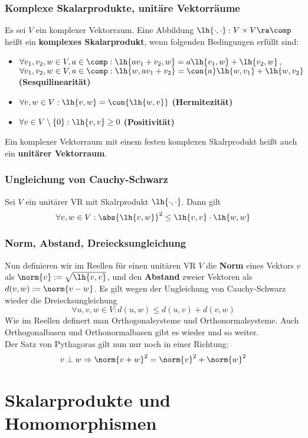 \documentclass{kit}
\begin{document}
    \subsubsection{Komplexe Skalarprodukte, unitäre Vektorräume}
      Es sei $V$ ein komplexer Vektorraum. Eine Abbildung $\lh{\cdot,\cdot}:V\times V\ra\comp$ heißt ein 
      \textbf{komplexes Skalarprodukt}, wenn folgenden Bedingungen erfüllt sind:
      \begin{itemize}
        \item $\forall v_1,v_2,w\in V,a\in\comp:\lh{av_1+v_2,w}=a\lh{v_1,w}+\lh{v_2,w}$,\\
          $\forall v_1,v_2,w\in V,a\in\comp:\lh{w,av_1+v_2}=\con{a}\lh{w,v_1}+\lh{w,v_2}$ \textbf{(Sesquilinearität)}
        \item $\forall v,w\in V:\lh{v,w}=\con{\lh{w,v}}$ \textbf{(Hermitezität)}
        \item $\forall v\in V\setminus\{0\}:\lh{v,v}\ge0$ \textbf{(Positivität)}
      \end{itemize}
      Ein komplexer Vektorraum mit einem festen komplexen Skalrprodukt heißt auch ein \textbf{unitärer Vektorraum}.
    \subsubsection{Ungleichung von Cauchy-Schwarz}
      Sei $V$ ein unitärer VR mit Skalrprodukt $\lh{\cdot,\cdot}$. Dann gilt
      $$\forall v,w\in V:\abs{\lh{v,w}}^2\le\lh{v,v}\cdot\lh{w,w}$$
    \subsubsection{Norm, Abstand, Dreiecksungleichung}
    Nun definieren wir im Reellen für einen unitären VR $V$ die \textbf{Norm} eines Vektors $v$ als 
    $\norm{v}:=\sqrt{\lh{v,v}}$, und den \textbf{Abstand} zweier Vektoren als $d(v,w):=\norm{v-w}$. Es gilt wegen der 
    Ungleichung von Cauchy-Schwarz wieder die Dreiecksungleichung
    $$\forall u,v,w\in V:d(u,w)\le d(u,v)+d(v,w)$$
    Wie im Reellen definert man Orthogonalsysteme und Orthonormalsysteme. Auch Orthogonalbasen und Orthonormalbasen gibt es
    wieder und so weiter.\\
    Der Satz von Pythagoras gilt nun nur noch in einer Richtung:
    $$v\perp w\Rightarrow\norm{v+w}^2=\norm{v}^2+\norm{w}^2$$
\section{Skalarprodukte und Homomorphismen}
\end{document}
